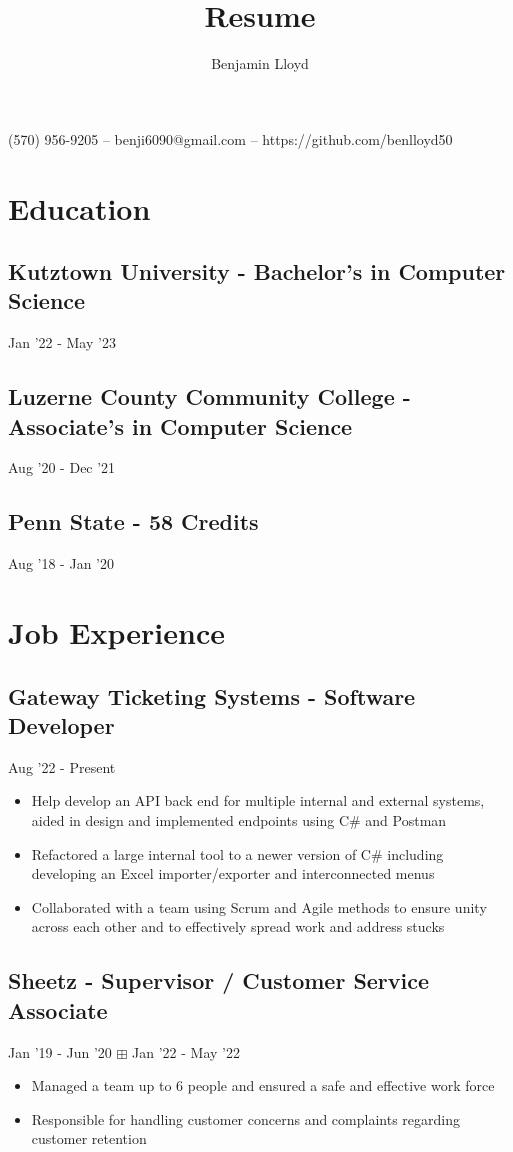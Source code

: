 \documentclass{article}
\makeatletter
\renewcommand{\maketitle}{
\begin{center}
{\huge\bfseries
\theauthor}

\vspace{.25em}

(570) 956-9205 -- benji6090@gmail.com -- https://github.com/benlloyd50

\end{center}
}
\makeatother
\begin{document}
\title{Resume}

\author{Benjamin Lloyd}

\maketitle

\section{Education}
\subsection{Kutztown University - Bachelor's in Computer Science} Jan '22 - May '23

\subsection{Luzerne County Community College - Associate's in Computer Science} Aug '20 - Dec '21

\subsection{Penn State - 58 Credits} Aug '18 - Jan '20

\section{Job Experience}
\subsection{Gateway Ticketing Systems - Software Developer} Aug '22 - Present
\begin{itemize}
    \item Help develop an API back end for multiple internal and external systems, aided in design and implemented endpoints using C\# and Postman
    \item Refactored a large internal tool to a newer version of C\# including developing an Excel importer/exporter and interconnected menus
    \item Collaborated with a team using Scrum and Agile methods to ensure unity across each other and to effectively spread work and address stucks
\end{itemize}

\subsection{Sheetz - Supervisor / Customer Service Associate} Jan '19 - Jun '20 $\boxplus$ Jan '22 - May '22
\begin{itemize}
  \item Managed a team up to 6 people and ensured a safe and effective work force
  \item Responsible for handling customer concerns and complaints regarding customer retention
\end{itemize}
\end{document}
